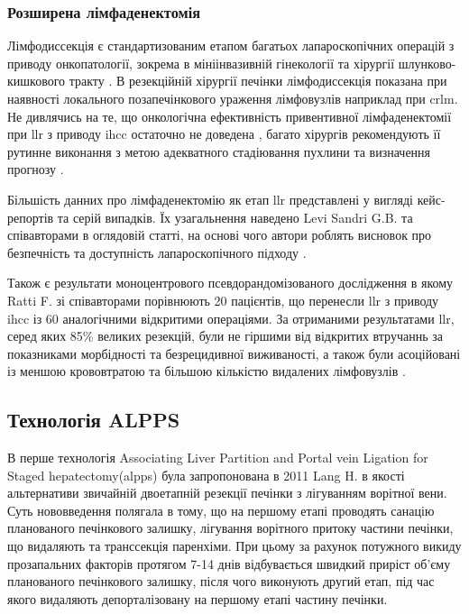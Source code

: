 \subsubsection{Розширена лімфаденектомія}

Лімфодиссекція є стандартизованим етапом багатьох лапароскопічних операцій з приводу онкопатології, зокрема в мініінвазивній гінекології та хірургії шлунково-кишкового тракту \cite{Eshuis2018, Jung2019}. В резекційній хірургії печінки лімфодиссекція показана при наявності локального позапечінкового ураження лімфовузлів наприклад при \acrshort{crlm}. Не дивлячись на те, що  онкологічна ефективність привентивної лімфаденектомії при \acrshort{llr} з приводу \acrshort{ihcc} остаточно не доведена \cite{Weber2015, Zhou2019a}, багато хірургів рекомендують її рутинне виконання з метою адекватного стадіювання пухлини та визначення прогнозу \cite{Waisberg2018, Ratti2020a}.

Більшість данних про лімфаденектомію як етап \acrshort{llr} представлені у вигляді кейс-репортів та серій випадків. Їх узагальнення  наведено Levi Sandri G.B. та співавторами в оглядовій статті, на основі чого автори роблять висновок про безпечність та доступність лапароскопічного підходу \cite{Colasanti2017}. 

Також є результати моноцентрового псевдорандомізованого дослідження в якому Ratti F. зі співавторами порівнюють 20 пацієнтів, що перенесли \acrshort{llr} з приводу \acrshort{ihcc} із 60 аналогічними відкритими операціями. За отриманими результатами \acrshort{llr}, серед яких 85\% великих резекцій, були не гіршими від відкритих втручаннь за показниками морбідності та безрецидивної виживаності, а також були асоційовані із меншою крововтратою та більшою кількістю видалених лімфовузлів \cite{Ratti2016a}. 

\subsection{Технологія ALPPS} 

В перше технологія Associating Liver Partition and Portal vein Ligation for Staged hepatectomy(\acrshort{alpps}) була запропонована в 2011  Lang H.  \cite{Baumgart2011} в якості альтернативи звичайній двоетапній резекції печінки з лігуванням ворітної вени. Суть нововведення полягала в тому, що на першому етапі проводять санацію планованого печінкового залишку, лігування ворітного притоку  частини печінки, що видаляють та транссекція паренхіми. При цьому за рахунок потужного викиду прозапальних факторів протягом 7-14 днів відбувається швидкий приріст об'єму планованого печінкового залишку, після чого виконують другий етап, під час якого видаляють депорталізовану на першому етапі частину печінки. 

